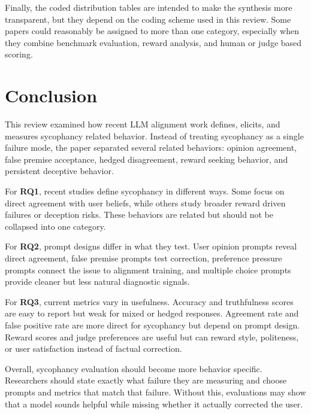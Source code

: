 \documentclass[letterpaper]{article} %
\begin{document}
Finally, the coded distribution tables are intended to make the synthesis more transparent, but they depend on the coding scheme used in this review. Some papers could reasonably be assigned to more than one category, especially when they combine benchmark evaluation, reward analysis, and human or judge based scoring.

\section{Conclusion}

This review examined how recent LLM alignment work defines, elicits, and measures sycophancy related behavior. Instead of treating sycophancy as a single failure mode, the paper separated several related behaviors: opinion agreement, false premise acceptance, hedged disagreement, reward seeking behavior, and persistent deceptive behavior.

For \textbf{RQ1}, recent studies define sycophancy in different ways. Some focus on direct agreement with user beliefs, while others study broader reward driven failures or deception risks. These behaviors are related but should not be collapsed into one category.

For \textbf{RQ2}, prompt designs differ in what they test. User opinion prompts reveal direct agreement, false premise prompts test correction, preference pressure prompts connect the issue to alignment training, and multiple choice prompts provide cleaner but less natural diagnostic signals.

For \textbf{RQ3}, current metrics vary in usefulness. Accuracy and truthfulness scores are easy to report but weak for mixed or hedged responses. Agreement rate and false positive rate are more direct for sycophancy but depend on prompt design. Reward scores and judge preferences are useful but can reward style, politeness, or user satisfaction instead of factual correction.

Overall, sycophancy evaluation should become more behavior specific. Researchers should state exactly what failure they are measuring and choose prompts and metrics that match that failure. Without this, evaluations may show that a model sounds helpful while missing whether it actually corrected the user.


\end{document}
